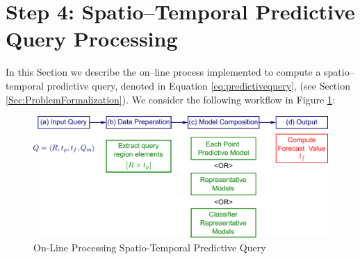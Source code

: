 
\section{Step 4: Spatio--Temporal Predictive Query Processing}
\label{Sec:SpatioTemporalQueryProcessing}	

In this Section we describe the on--line process implemented to compute a spatio--temporal predictive query, denoted in Equation \ref{eq:predictivequery}, (see Section \ref{Sec:ProblemFormalization}). We consider the following workflow in Figure \ref{Fig:OnLineQP}: 

\begin{figure}[h]
	\centering
	\includegraphics[scale=0.35]{../Figures/Query_Processing}
	\caption{On-Line Processing Spatio-Temporal Predictive Query}
	\label{Fig:OnLineQP}
\end{figure}

